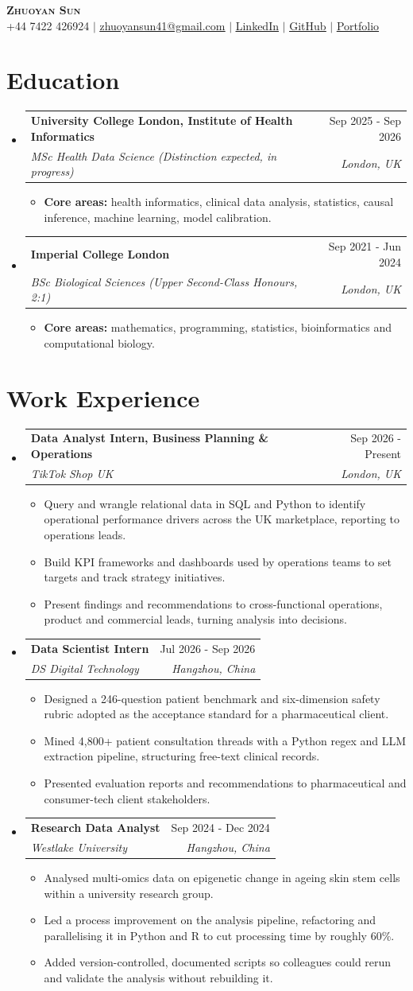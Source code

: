 \documentclass[letterpaper,11pt]{article}
\makeatletter
\newcommand{\resumeItem}[1]{\item\small{{#1 \vspace{-2pt}}}}
\newcommand{\resumeSubheading}[4]{\vspace{-2pt}\item\begin{tabular*}{0.97\textwidth}[t]{l@{\extracolsep{\fill}}r}\textbf{#1} & #2 \\\textit{\small#3} & \textit{\small #4} \\\end{tabular*}\vspace{-7pt}}
\newcommand{\resumeSubHeadingListStart}{\begin{itemize}[leftmargin=0.15in,label={}]}\newcommand{\resumeSubHeadingListEnd}{\end{itemize}}
\newcommand{\resumeItemListStart}{\begin{itemize}}\newcommand{\resumeItemListEnd}{\end{itemize}\vspace{-5pt}}
\makeatother
\begin{document}
\begin{center}\textbf{\Huge \scshape Zhuoyan Sun} \\ \vspace{3pt}\small +44 7422 426924 $|$ \href{mailto:zhuoyansun41@gmail.com}{\underline{zhuoyansun41@gmail.com}} $|$ \href{https://www.linkedin.com/in/zhuoyan-jennifer-sun-8b6558297}{\underline{LinkedIn}} $|$ \href{https://github.com/jennifersun09b}{\underline{GitHub}} $|$ \href{https://jennifersun09b.github.io/portfolio/}{\underline{Portfolio}}\end{center}
\section{\textbf{Education}}\resumeSubHeadingListStart
\resumeSubheading{University College London, Institute of Health Informatics}{Sep 2025 - Sep 2026}{MSc Health Data Science (Distinction expected, in progress)}{London, UK}\resumeItemListStart\resumeItem{\textbf{Core areas:} health informatics, clinical data analysis, statistics, causal inference, machine learning, model calibration.}\resumeItemListEnd
\resumeSubheading{Imperial College London}{Sep 2021 - Jun 2024}{BSc Biological Sciences (Upper Second-Class Honours, 2:1)}{London, UK}\resumeItemListStart\resumeItem{\textbf{Core areas:} mathematics, programming, statistics, bioinformatics and computational biology.}\resumeItemListEnd\resumeSubHeadingListEnd
\section{\textbf{Work Experience}}\resumeSubHeadingListStart
\resumeSubheading{Data Analyst Intern, Business Planning \& Operations}{Sep 2026 - Present}{TikTok Shop UK}{London, UK}\resumeItemListStart
\resumeItem{Query and wrangle relational data in SQL and Python to identify operational performance drivers across the UK marketplace, reporting to operations leads.}
\resumeItem{Build KPI frameworks and dashboards used by operations teams to set targets and track strategy initiatives.}
\resumeItem{Present findings and recommendations to cross-functional operations, product and commercial leads, turning analysis into decisions.}\resumeItemListEnd
\resumeSubheading{Data Scientist Intern}{Jul 2026 - Sep 2026}{DS Digital Technology}{Hangzhou, China}\resumeItemListStart
\resumeItem{Designed a 246-question patient benchmark and six-dimension safety rubric adopted as the acceptance standard for a pharmaceutical client.}
\resumeItem{Mined 4,800+ patient consultation threads with a Python regex and LLM extraction pipeline, structuring free-text clinical records.}
\resumeItem{Presented evaluation reports and recommendations to pharmaceutical and consumer-tech client stakeholders.}\resumeItemListEnd
\resumeSubheading{Research Data Analyst}{Sep 2024 - Dec 2024}{Westlake University}{Hangzhou, China}\resumeItemListStart
\resumeItem{Analysed multi-omics data on epigenetic change in ageing skin stem cells within a university research group.}
\resumeItem{Led a process improvement on the analysis pipeline, refactoring and parallelising it in Python and R to cut processing time by roughly 60\%.}
\resumeItem{Added version-controlled, documented scripts so colleagues could rerun and validate the analysis without rebuilding it.}\resumeItemListEnd\resumeSubHeadingListEnd
\end{document}
